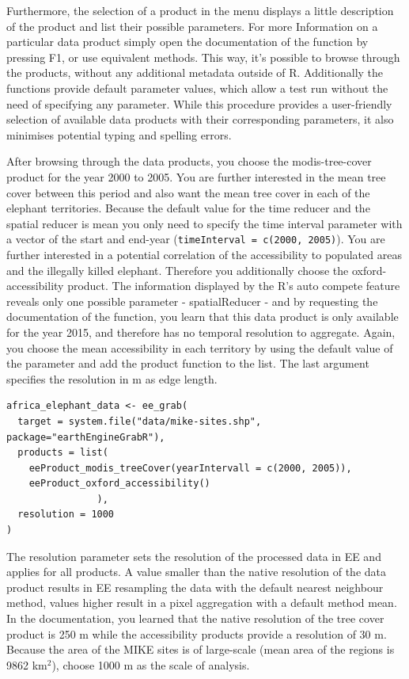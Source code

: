 Furthermore, the selection of a product in the menu displays a little description of the product and list their possible parameters. For more Information on a particular data product simply open the documentation of the function by pressing F1, or use equivalent methods. This way, it's possible to browse through the products, without any additional metadata outside of R. Additionally the functions provide default parameter values, which allow a test run without the need of specifying any parameter. While this procedure provides a user-friendly selection of available data products with their corresponding parameters, it also minimises potential typing and spelling errors.

After browsing through the data products, you choose the modis-tree-cover product for the year 2000 to 2005. You are further interested in the mean tree cover between this period and also want the mean tree cover in each of the elephant territories. Because the default value for the time reducer and the spatial reducer is mean you only need to specify the time interval parameter with a vector of the start and end-year (\texttt{timeInterval = c(2000, 2005)}). You are further interested in a potential correlation of the accessibility to populated areas and the illegally killed elephant. Therefore you additionally choose the oxford-accessibility product. The information displayed by the R's auto compete feature reveals only one possible parameter - spatialReducer - and by requesting the documentation of the function, you learn that this data product is only available for the year 2015, and therefore has no temporal resolution to aggregate. Again, you choose the mean accessibility in each territory by using the default value of the parameter and add the product function to the list. The last argument specifies the resolution in m as edge length. 


\begin{lstlisting}
africa_elephant_data <- ee_grab(
  target = system.file("data/mike-sites.shp", package="earthEngineGrabR"),
  products = list(
    eeProduct_modis_treeCover(yearIntervall = c(2000, 2005)),
    eeProduct_oxford_accessibility()
                ),
  resolution = 1000
)

\end{lstlisting}

The resolution parameter sets the resolution of the processed data in EE and applies for all products. A value smaller than the native resolution of the data product results in EE resampling the data with the default nearest neighbour method, values higher result in a pixel aggregation with a default method mean. In the documentation, you learned that the native resolution of the tree cover product is 250 m while the accessibility products provide a resolution of 30 m. Because the area of the MIKE sites is of large-scale (mean area of the regions is 9862 km$^2$), choose 1000 m as the scale of analysis. 



